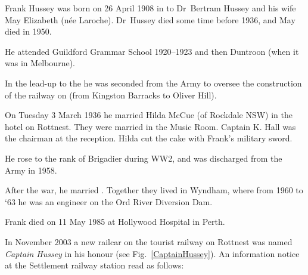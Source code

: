 
Frank Hussey was born on 26 April 1908 in \cite{RaeWestAus}
to Dr~Bertram Hussey and his wife May Elizabeth (n\'{e}e Laroche).\cite{WesternMail1936, TheWest1950}
Dr~Hussey died some time before 1936,\cite{MilitaryWedding} and May died in 1950.\cite{TheWest1950}

He attended Guildford Grammar School 1920--1923\cite{FBHguildford}
and then Duntroon (when it was in Melbourne).\cite{RaeWestAus}

In the lead-up to the  he was seconded from the Army to oversee the construction of the railway on 
(from Kingston Barracks to Oliver Hill).\cite{RaeWestAus}

On Tuesday 3 March 1936 he married Hilda McCue (of Rockdale NSW\cite{WestAus1936p4})
in the hotel on Rottnest.\cite{WestAus1936p19}
They were married in the Music Room.\cite{MilitaryWedding}
Captain K. Hall was the chairman at the reception.\cite{MilitaryWedding}
Hilda cut the cake with Frank's military sword.\cite{MilitaryWedding}

He rose to the rank of Brigadier during WW2,\cite{FBHwar}
and was discharged from the Army in 1958.\cite{CaptainHusseyDisplay}

After the war, he married . Together they lived in Wyndham,
where from 1960 to `63 he was an engineer on the Ord River Diversion Dam.

Frank died on 11 May 1985 at Hollywood Hospital in Perth.

In November 2003 a new railcar on the tourist railway on Rottnest was named \emph{Captain Hussey} in his honour (see Fig.~\ref{CaptainHussey}).\cite{RIA2004}
An information notice at the Settlement railway station read as follows:\cite{CaptainHusseyDisplay}

